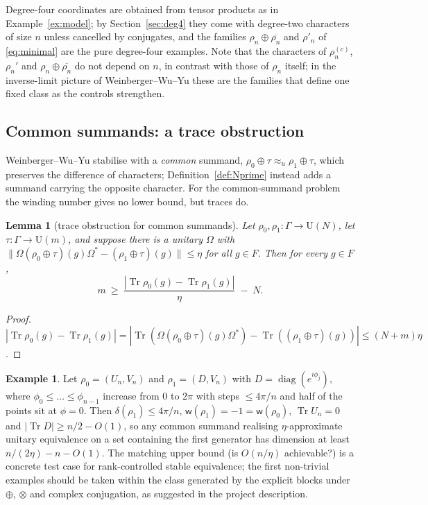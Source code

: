 \documentclass[11pt]{amsart}
\newtheorem{lemma}[theorem]{Lemma}
\theoremstyle{definition}
\newtheorem{example}[theorem]{Example}
\theoremstyle{remark}
\newcommand{\Tr}{\operatorname{Tr}}
\newcommand{\wind}{\mathsf w}
\newcommand{\U}{\mathrm U}
\newcommand{\norm}[1]{\lVert #1\rVert}
\begin{document}
Degree-four coordinates are obtained from tensor products as in Example~\ref{ex:model}; by Section~\ref{sec:deg4} they come with degree-two characters of size $n$ unless cancelled by conjugates, and the families $\rho_n\oplus\overline{\rho_n}$ and $\rho'_n$ of \eqref{eq:minimal} are the pure degree-four examples. Note that the characters of $\rho_n^{(c)}$, $\rho_n'$ and $\rho_n\oplus\overline{\rho_n}$ do not depend on $n$, in contrast with those of $\rho_n$ itself; in the inverse-limit picture of Weinberger--Wu--Yu these are the families that define one fixed class as the controls strengthen.

\subsection{Common summands: a trace obstruction}

Weinberger--Wu--Yu stabilise with a \emph{common} summand, $\rho_0\oplus\tau\approx_u\rho_1\oplus\tau$, which preserves the difference of characters; Definition~\ref{def:Nprime} instead adds a summand carrying the opposite character. For the common-summand problem the winding number gives no lower bound, but traces do.

\begin{lemma}[trace obstruction for common summands]\label{lem:trace}
Let $\rho_0,\rho_1\colon\Gamma\to\U(N)$, let $\tau\colon\Gamma\to\U(m)$, and suppose there is a unitary $\Omega$ with $\norm{\Omega(\rho_0\oplus\tau)(g)\Omega^*-(\rho_1\oplus\tau)(g)}\le\eta$ for all $g\in F$. Then for every $g\in F$,
\[
m\ \ge\ \frac{|\Tr\rho_0(g)-\Tr\rho_1(g)|}{\eta}\;-\;N .
\]
\end{lemma}
\begin{proof}
$|\Tr\rho_0(g)-\Tr\rho_1(g)|=|\Tr(\Omega(\rho_0\oplus\tau)(g)\Omega^*)-\Tr((\rho_1\oplus\tau)(g))|\le(N+m)\eta$.
\end{proof}

\begin{example}
Let $\rho_0=(U_n,V_n)$ and $\rho_1=(D,V_n)$ with $D=\operatorname{diag}(e^{i\phi_j})$, where $\phi_0\le\dots\le\phi_{n-1}$ increase from $0$ to $2\pi$ with steps $\le4\pi/n$ and half of the points sit at $\phi=0$. Then $\delta(\rho_1)\le4\pi/n$, $\wind(\rho_1)=-1=\wind(\rho_0)$, $\Tr U_n=0$ and $|\Tr D|\ge n/2-O(1)$, so any common summand realising $\eta$-approximate unitary equivalence on a set containing the first generator has dimension at least $n/(2\eta)-n-O(1)$. The matching upper bound (is $O(n/\eta)$ achievable?) is a concrete test case for rank-controlled stable equivalence; the first non-trivial examples should be taken within the class generated by the explicit blocks under $\oplus$, $\otimes$ and complex conjugation, as suggested in the project description.
\end{example}
\end{document}
